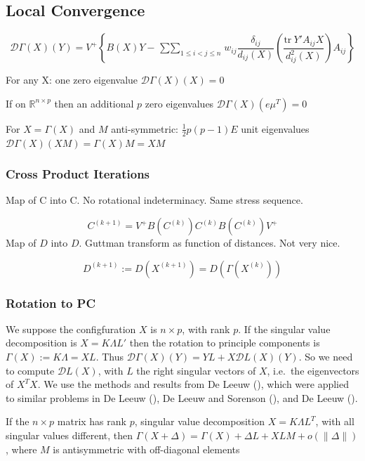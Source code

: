 \documentclass[
  12pt,
  letterpaper,
  DIV=11,
  numbers=noendperiod]{scrreprt}
\theoremstyle{remark}
\begin{document}
\subsection{Local Convergence}\label{minlocconv}

\[
\mathcal{D}\Gamma(X)(Y)=V^+\left\{B(X)Y-\mathop{\sum\sum}_{1\leq i<j\leq n} w_{ij}\frac{\delta_{ij}}{d_{ij}(X)}\left(\frac{\text{tr}\ Y'A_{ij}X}{d_{ij}^2(X)}\right)A_{ij}\right\}
\]

For any X: one zero eigenvalue \(\mathcal{D}\Gamma(X)(X)=0\)

If on \(\mathbb{R}^{n\times p}\) then an additional \(p\) zero
eigenvalues \(\mathcal{D}\Gamma(X)(e\mu^T)=0\)

For \(X=\Gamma(X)\) and \(M\) anti-symmetric: \(\frac12 p(p-1)E\) unit
eigenvalues \(\mathcal{D}\Gamma(X)(XM)=\Gamma(X)M=XM\)

\subsubsection{Cross Product Iterations}\label{cross-product-iterations}

Map of C into C. No rotational indeterminacy. Same stress sequence.

\[
C^{(k+1)}=V^+B(C^{(k)})C^{(k)}B(C^{(k)})V^+
\] Map of \(D\) into \(D\). Guttman transform as function of distances.
Not very nice.

\[
D^{(k+1)}:=D(X^{(k+1)})=D(\Gamma(X^{(k)}))
\]

\subsubsection{Rotation to PC}\label{rotation-to-pc}

We suppose the configfuration \(X\) is \(n\times p\), with rank \(p\).
If the singular value decomposition is \(X=K\Lambda L'\) then the
rotation to principle components is \(\Gamma(X):=K\Lambda=XL\). Thus
\(\mathcal{D}\Gamma(X)(Y)=YL+X\mathcal{D}L(X)(Y)\). So we need to
compute \(\mathcal{D}L(X)\), with \(L\) the right singular vectors of
\(X\), i.e.~the eigenvectors of \(X^TX\). We use the methods and results
from De Leeuw (), which were applied
to similar problems in De Leeuw (), De
Leeuw and Sorenson (), and De
Leeuw ().

\label{minrotpc}
If the \(n\times p\) matrix has rank \(p\), singular value decomposition
\(X=K\Lambda L^T\), with all singular values different, then
\(\Gamma(X+\Delta)=\Gamma(X)+\Delta L+XLM+o(\|\Delta\|)\), where \(M\)
is antisymmetric with off-diagonal elements
\end{document}

